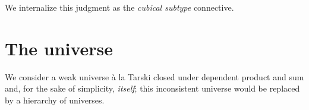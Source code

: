 \documentclass[final]{amsart}
\begin{document}
\begin{mathparpagebreakable}
\end{mathparpagebreakable}

We internalize this judgment as the \emph{cubical subtype} connective.


\section{The universe}

We consider a weak universe \`a la Tarski closed under dependent product and sum
and, for the sake of simplicity, \emph{itself}; this inconsistent universe would
be replaced by a hierarchy of universes.
\end{document}
